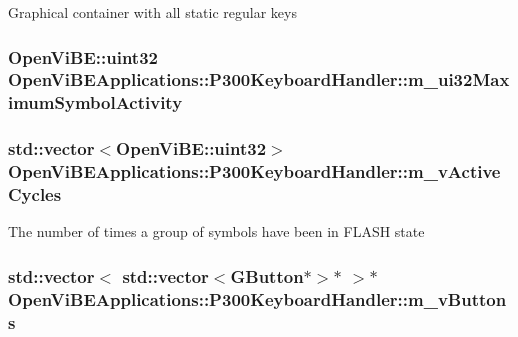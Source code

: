 \label{classOpenViBEApplications_1_1P300KeyboardHandler_a22390cd11cae7a74d0d22a52edb4f32c}
Graphical container with all static regular keys \hypertarget{classOpenViBEApplications_1_1P300KeyboardHandler_ac82daa9b67e49894444473acf01bc075}{
\subsubsection[{m\_\-ui32MaximumSymbolActivity}]{\setlength{\rightskip}{0pt plus 5cm}OpenViBE::uint32 {\bf OpenViBEApplications::P300KeyboardHandler::m\_\-ui32MaximumSymbolActivity}}}
\label{classOpenViBEApplications_1_1P300KeyboardHandler_ac82daa9b67e49894444473acf01bc075}
\hypertarget{classOpenViBEApplications_1_1P300KeyboardHandler_ad280c1e2d6f779b4720d8c11b7113aaf}{
\subsubsection[{m\_\-vActiveCycles}]{\setlength{\rightskip}{0pt plus 5cm}std::vector$<$OpenViBE::uint32$>$ {\bf OpenViBEApplications::P300KeyboardHandler::m\_\-vActiveCycles}}}
\label{classOpenViBEApplications_1_1P300KeyboardHandler_ad280c1e2d6f779b4720d8c11b7113aaf}
The number of times a group of symbols have been in FLASH state \hypertarget{classOpenViBEApplications_1_1P300KeyboardHandler_a66266cf621af51049274763bff5f1f15}{
\subsubsection[{m\_\-vButtons}]{\setlength{\rightskip}{0pt plus 5cm}std::vector$<$ std::vector$<${\bf GButton}$\ast$$>$$\ast$ $>$$\ast$ {\bf OpenViBEApplications::P300KeyboardHandler::m\_\-vButtons}}}
